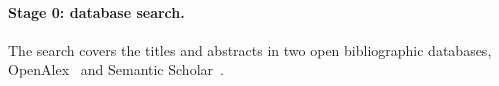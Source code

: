 \documentclass[twoside,its]{bossthesis}
\begin{document}
\paragraph{Stage 0: database search.} The search covers the titles and abstracts
in two open bibliographic databases, OpenAlex~\parencite{priem2022openalex} and
Semantic Scholar~\parencite{kinney2023semantic}.
%
%
\end{document}
